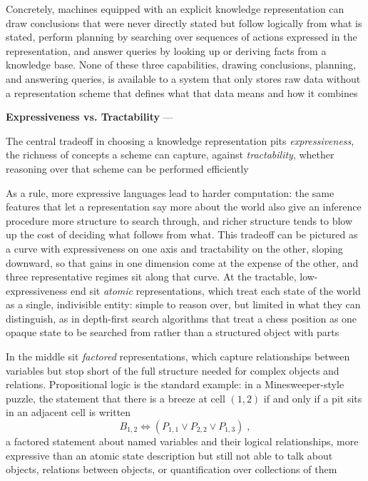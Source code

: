 Concretely, machines equipped with an explicit knowledge representation can
draw conclusions that were never directly stated but follow logically from
what is stated, perform planning by searching over sequences of actions
expressed in the representation, and answer queries by looking up or
deriving facts from a knowledge base. None of these three capabilities,
drawing conclusions, planning, and answering queries, is available to a
system that only stores raw data without a representation scheme that
defines what that data means and how it combines

\textbf{Expressiveness vs. Tractability} --- \begin{definition}
  The central tradeoff in choosing a knowledge representation pits
  \emph{expressiveness}, the richness of concepts a scheme can capture,
  against \emph{tractability}, whether reasoning over that scheme can be
  performed efficiently
\end{definition}
As a rule, more expressive languages lead to harder computation: the same
features that let a representation say more about the world also give an
inference procedure more structure to search through, and richer structure
tends to blow up the cost of deciding what follows from what. This tradeoff
can be pictured as a curve with expressiveness on one axis and tractability
on the other, sloping downward, so that gains in one dimension come at the
expense of the other, and three representative regimes sit along that
curve. At the tractable, low-expressiveness end sit \emph{atomic}
representations, which treat each state of the world as a single,
indivisible entity: simple to reason over, but limited in what they can
distinguish, as in depth-first search algorithms that treat a chess
position as one opaque state to be searched from rather than a structured
object with parts

In the middle sit \emph{factored} representations, which capture
relationships between variables but stop short of the full structure needed
for complex objects and relations. Propositional logic is the standard
example: in a Minesweeper-style puzzle, the statement that there is a
breeze at cell $(1,2)$ if and only if a pit sits in an adjacent cell is
written
\begin{equation}
  \label{eq:minesweeper-breeze}
  B_{1,2} \Leftrightarrow (P_{1,1} \lor P_{2,2} \lor P_{1,3})\;,
\end{equation}
a factored statement about named variables and their logical relationships,
more expressive than an atomic state description but still not able to
talk about objects, relations between objects, or quantification over
collections of them


